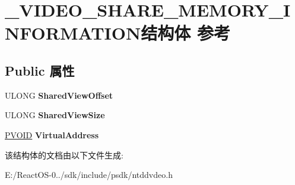 \hypertarget{struct___v_i_d_e_o___s_h_a_r_e___m_e_m_o_r_y___i_n_f_o_r_m_a_t_i_o_n}{}\section{\+\_\+\+V\+I\+D\+E\+O\+\_\+\+S\+H\+A\+R\+E\+\_\+\+M\+E\+M\+O\+R\+Y\+\_\+\+I\+N\+F\+O\+R\+M\+A\+T\+I\+O\+N结构体 参考}
\label{struct___v_i_d_e_o___s_h_a_r_e___m_e_m_o_r_y___i_n_f_o_r_m_a_t_i_o_n}
\subsection*{Public 属性}
\begin{DoxyCompactItemize}
\item 
\mbox{\label{struct___v_i_d_e_o___s_h_a_r_e___m_e_m_o_r_y___i_n_f_o_r_m_a_t_i_o_n_abec319f2cd40d4b2ddacc51c2d692e36}} 
U\+L\+O\+NG {\bfseries Shared\+View\+Offset}
\item 
\mbox{\label{struct___v_i_d_e_o___s_h_a_r_e___m_e_m_o_r_y___i_n_f_o_r_m_a_t_i_o_n_a52b1344ed79a51aeadd567964bdb0efa}} 
U\+L\+O\+NG {\bfseries Shared\+View\+Size}
\item 
\mbox{\label{struct___v_i_d_e_o___s_h_a_r_e___m_e_m_o_r_y___i_n_f_o_r_m_a_t_i_o_n_a3ab77e565fd252a856cc2b288dc77fb6}} 
\hyperlink{interfacevoid}{P\+V\+O\+ID} {\bfseries Virtual\+Address}
\end{DoxyCompactItemize}


该结构体的文档由以下文件生成\+:\begin{DoxyCompactItemize}
\item 
E\+:/\+React\+O\+S-\/0../sdk/include/psdk/ntddvdeo.\+h\end{DoxyCompactItemize}
